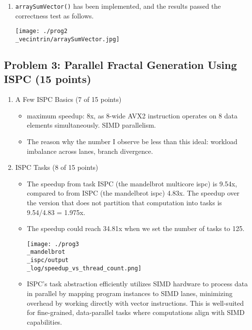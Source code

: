 \documentclass[letterpaper,11pt]{exam}
\begin{document}
\begin{questions}
\begin{enumerate}[label=\roman*.]
        \item \texttt{arraySumVector()} has been implemented, and the results passed the correctness test as follows.

              \texttt{[image: ./prog2\\\_vecintrin/arraySumVector.jpg]}
    \end{enumerate}



    \newpage

    \question
    \subsection*{Problem 3: Parallel Fractal Generation Using ISPC (15 points)}

    \begin{enumerate}[label=\roman*.]
        \item A Few ISPC Basics (7 of 15 points)

              \begin{itemize}
                  \item maximum speedup: 8x, as 8-wide AVX2 instruction operates on 8 data elements simultaneously. SIMD parallelism.
                  \item The reason why the number I observe be less than this ideal: workload imbalance across lanes, branch divergence.
              \end{itemize}

        \item ISPC Tasks (8 of 15 points)

              \begin{itemize}
                  \item The speedup from task ISPC (the mandelbrot multicore ispc) is 9.54x, compared to from ISPC (the mandelbrot ispc) 4.83x.
                        The speedup over the version that does not partition that computation into tasks is 9.54/4.83 = 1.975x.
                  \item The speedup could reach 34.81x when we set the number of tasks to 125.

                        \texttt{[image: ./prog3\\\_mandelbrot\\\_ispc/output\\\_log/speedup\_vs\_thread\_count.png]}
                  \item ISPC's task abstraction efficiently utilizes SIMD hardware to process data in parallel by mapping program instances to SIMD lanes, minimizing overhead by working directly with vector instructions. This is well-suited for fine-grained, data-parallel tasks where computations align with SIMD capabilities.


\end{itemize}
\end{enumerate}
\end{questions}
\end{document}
